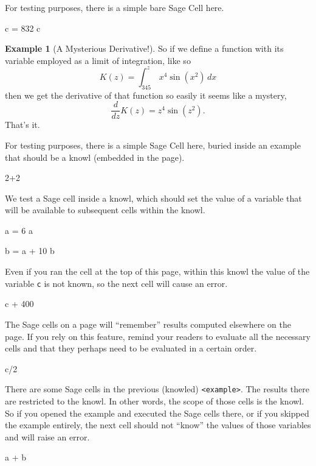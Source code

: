 \documentclass{amsart}
\theoremstyle{plain}%
\theoremstyle{definition}%
\newtheorem{example}[theorem]{Example}
\theoremstyle{remark}%
\newcommand{\mono}[1]{\texttt{#1}}
\numberwithin{equation}{section}
\newcommand{\definiteintegral}[4]{\int_{#1}^{#2}\,#3\,d#4}
\begin{document}
For testing purposes, there is a simple bare Sage Cell here.%
\begin{sageinput}
c = 832
c
\end{sageinput}
\begin{example}[A Mysterious Derivative!]\label{example-mysterious}%
%
So if we define a function with its variable employed as a limit of integration, like so%
\begin{equation*}
K(z)=\definiteintegral{345}{z}{x^4\sin(x^2)}{x}
\end{equation*}
then we get the derivative of that function so easily it seems like a mystery,%
\begin{equation*}
\frac{d}{dz}K(z)=z^4\sin(z^2)\text{.}
\end{equation*}
That's it.%
\par
For testing purposes, there is a simple Sage Cell here, buried inside an example that should be a knowl (embedded in the page).%
\begin{sageinput}
2+2
\end{sageinput}
We test a Sage cell inside a knowl, which should set the value of a variable that will be available to subsequent cells within the knowl.%
\begin{sageinput}
a = 6
a
\end{sageinput}
\begin{sageinput}
b = a + 10
b
\end{sageinput}
Even if you ran the cell at the top of this page, within this knowl the value of the variable \mono{c} is not known, so the next cell will cause an error.%
\begin{sageinput}
c + 400
\end{sageinput}
\end{example}
The Sage cells on a page will ``remember'' results computed elsewhere on the page.  If you rely on this feature, remind your readers to evaluate all the necessary cells and that they perhaps need to be evaluated in a certain order.%
\begin{sageinput}
c/2
\end{sageinput}
There are some Sage cells in the previous (knowled) \mono{<example>}.  The results there are restricted to the knowl.  In other words, the scope of those cells is the knowl.  So if you opened the example and executed the Sage cells there, or if you skipped the example entirely, the next cell should not ``know'' the values of those variables and will raise an error.%
\begin{sageinput}
a + b
\end{sageinput}
\end{document}
